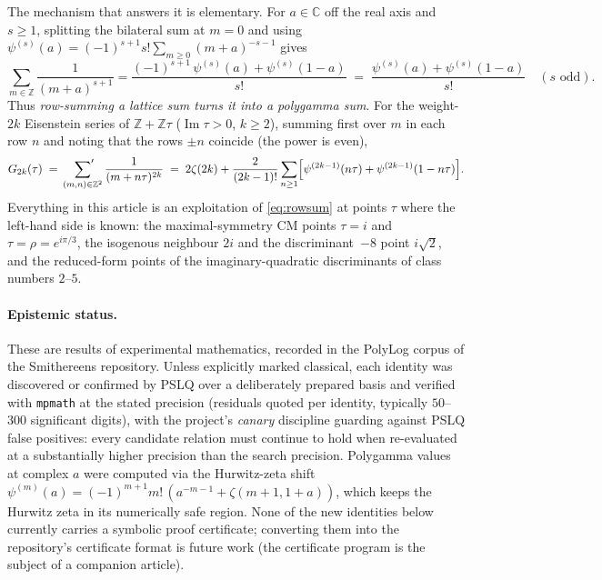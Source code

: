 \documentclass[11pt]{article}
\theoremstyle{remark}
\begin{document}
The mechanism that answers it is elementary. For $a\in\mathbb{C}$ off the real axis and
$s\ge 1$, splitting the bilateral sum at $m=0$ and using
$\psi^{(s)}(a)=(-1)^{s+1}s!\sum_{m\ge 0}(m+a)^{-s-1}$ gives
\begin{equation}\label{eq:bilateral}
\sum_{m\in\mathbb{Z}}\frac{1}{(m+a)^{s+1}}
=\frac{(-1)^{s+1}\,\psi^{(s)}(a)+\psi^{(s)}(1-a)}{s!}
\;=\;\frac{\psi^{(s)}(a)+\psi^{(s)}(1-a)}{s!}\quad(s\text{ odd}).
\end{equation}
Thus \emph{row-summing a lattice sum turns it into a polygamma sum}. For the weight-$2k$
Eisenstein series of $\mathbb{Z}+\mathbb{Z}\tau$ ($\operatorname{Im}\tau>0$, $k\ge 2$),
summing first over $m$ in each row $n$ and noting that the rows $\pm n$ coincide (the power is
even),
\begin{equation}\label{eq:rowsum}
G_{2k}(\tau)\;=\;\sideset{}{'}\sum_{(m,n)\in\mathbb{Z}^2}\frac{1}{(m+n\tau)^{2k}}
\;=\;2\zeta(2k)+\frac{2}{(2k-1)!}\sum_{n\ge 1}
\Bigl[\psi^{(2k-1)}(n\tau)+\psi^{(2k-1)}(1-n\tau)\Bigr].
\end{equation}
Everything in this article is an exploitation of \eqref{eq:rowsum} at points $\tau$ where the
left-hand side is known: the maximal-symmetry CM points $\tau=i$ and $\tau=\rho=e^{i\pi/3}$,
the isogenous neighbour $2i$ and the discriminant~$-8$ point $i\sqrt2$, and the
reduced-form points of the imaginary-quadratic discriminants of class numbers $2$--$5$.

\paragraph{Epistemic status.}
These are results of experimental mathematics, recorded in the PolyLog corpus of the
Smithereens repository. Unless explicitly marked classical, each identity was discovered or
confirmed by PSLQ over a deliberately prepared basis and verified with \texttt{mpmath} at the
stated precision (residuals quoted per identity, typically $50$--$300$ significant digits),
with the project's \emph{canary} discipline guarding against PSLQ false positives: every
candidate relation must continue to hold when re-evaluated at a substantially higher precision
than the search precision. Polygamma values at complex $a$ were computed via the
Hurwitz-zeta shift $\psi^{(m)}(a)=(-1)^{m+1}m!\,(a^{-m-1}+\zeta(m+1,1+a))$, which keeps the
Hurwitz zeta in its numerically safe region. None of the new identities below currently
carries a symbolic proof certificate; converting them into the repository's certificate
format is future work (the certificate program is the subject of a companion article).
\end{document}
